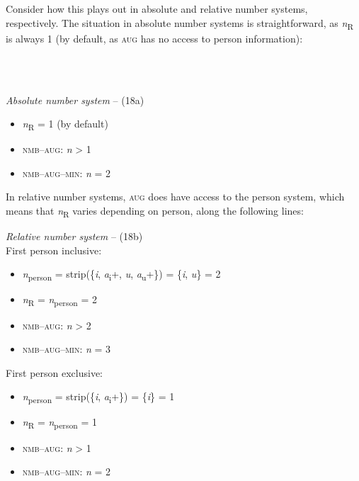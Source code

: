 \documentclass[output=paper]{langsci/langscibook}
\begin{document}
  Consider how this plays out in absolute and relative number systems, respectively. The situation in absolute number systems is straightforward, as \textit{n}\textsubscript{R} is always 1 (by default, as \textsc{aug} has no access to person information):

\ea 
 \gll \\
   \\
 \glt
\z

    \textit{Absolute number system} – (18a)

\begin{itemize}
\item \textit{n}\textsubscript{R} = 1 (by default)
\item \textsc{nmb}–\textsc{aug}: \textit{n} > 1
\item \textsc{nmb}–\textsc{aug}–\textsc{min}: \textit{n} = 2
\end{itemize}

In relative number systems, \textsc{aug} does have access to the person system, which means that \textit{n}\textsubscript{R} varies depending on person, along the following lines:

\ea \textit{Relative number system} – (18b)\\
\ea First person inclusive:\\

\begin{itemize}
\item \textit{n}\textsubscript{person}  =  {\textbar}strip(\{\textit{i}, \textit{a}\textsubscript{i}+, \textit{u}, \textit{a}\textsubscript{u}+\}){\textbar}  =  {\textbar}\{\textit{i}, \textit{u}\}{\textbar}  =  2
\item \textit{n}\textsubscript{R}  =  \textit{n}\textsubscript{person}  =  2
\item \textsc{nmb}–\textsc{aug}: \textit{n} > 2
\item \textsc{nmb}–\textsc{aug}–\textsc{min}: \textit{n} = 3
\end{itemize}

  \ex First person exclusive: \\

\begin{itemize}
\item \textit{n}\textsubscript{person}  =  {\textbar}strip(\{\textit{i}, \textit{a}\textsubscript{i}+\}){\textbar}  =  {\textbar}\{\textit{i}\}{\textbar}  =  1
\item \textit{n}\textsubscript{R}  =  \textit{n}\textsubscript{person}  =  1
\item \textsc{nmb}–\textsc{aug}: \textit{n} > 1
\item \textsc{nmb}–\textsc{aug}–\textsc{min}: \textit{n} = 2
\end{itemize}
\end{document}
